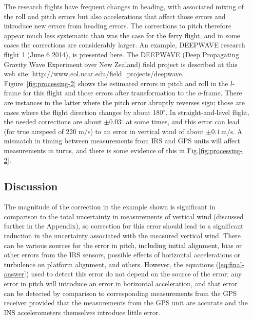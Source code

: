 \documentclass[english,british,amtd,bookmarks=false,unicode=true]{copernicus}\usepackage[]{graphicx}\usepackage[]{color}
\begin{document}
The research flights have frequent changes in heading, with associated
mixing of the roll and pitch errors but also accelerations that affect
those errors and introduce new errors from heading errors. The corrections
to pitch therefore appear much less systematic than was the case for
the ferry flight, and in some cases the corrections are considerably
larger. An example, DEEPWAVE research flight 1 (June 6 2014), is presented
here. The DEEPWAVE (Deep Propagating Gravity Wave Experiment over
New Zealand) field project is described at this web site: http://www.eol.ucar.edu/field\_projects/deepwave.
Figure~\ref{fig:processing-2} shows the estimated errors in pitch
and roll in the $l$-frame for this flight and those errors after
transformation to the $a$-frame. There are instances in the latter
where the pitch error abruptly reverses sign; those are cases where
the flight direction changes by about 180$^{\circ}$. In straight-and-level
flight, the needed corrections are about $\pm$0.03$^{\circ}$ at
some times, and this error can lead (for true airspeed of 220 m/s)
to an error in vertical wind of about $\pm0.1$\,m/s. A mismatch
in timing between measurements from IRS and GPS units will affect
measurements in turns, and there is some evidence of this in Fig.\-\ref{fig:processing-2}. 


\subsection{Discussion}

The magnitude of the correction in the example shown is significant
in comparison to the total uncertainty in measurements of vertical
wind (discussed further in the Appendix), so correction for this error
should lead to a significant reduction in the uncertainty associated
with the measured vertical wind. There can be various sources for
the error in pitch, including initial alignment, bias or other errors
from the IRS sensors, possible effects of horizontal accelerations
or turbulence on platform alignment, and others. However, the equations
(\ref{eq:final-answer}) used to detect this error do not depend on
the source of the error; any error in pitch will introduce an error
in horizontal acceleration, and that error can be detected by comparison
to corresponding measurements from the GPS receiver provided that
the measurements from the GPS unit are accurate and the INS accelerometers
themselves introduce little error. 
\end{document}
